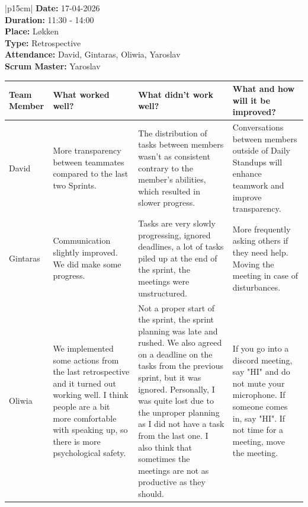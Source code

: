 \begin{table}[H]
    \centering
    \begin{tabular}{|p{15cm}|}   
        \hline
        \textbf{Date:}  17-04-2026 \\
        \textbf{Duration:} 11:30 - 14:00 \\
        \textbf{Place:}  Løkken \\
        \textbf{Type:} Retrospective \\
        \textbf{Attendance:} David, Gintaras, Oliwia, Yaroslav \\
        \textbf{Scrum Master:} Yaroslav 
        \begin{table}[H]
            \begin{tabular}{|p{1.75cm}|p{4cm}|p{4cm}|p{4cm}|}
                \hline
                \cellcolor[HTML]{BFBFBF}  \textbf{Team Member} & \cellcolor[HTML]{BFBFBF} \textbf{What worked well?} & \cellcolor[HTML]{BFBFBF}  \textbf{What didn’t work well?} & \cellcolor[HTML]{BFBFBF}  \textbf{What and how will it be improved?}\\
                \hline
                \cellcolor[HTML]{d4d4d4} David & More transparency between teammates compared to the last two Sprints. & The distribution of tasks between members wasn't as consistent contrary to the member's abilities, which resulted in slower progress.  & Conversations between members outside of Daily Standups will enhance teamwork and improve transparency.  \\
                \hline
                \cellcolor[HTML]{d4d4d4} Gintaras & Communication slightly improved. We did make some progress. & Tasks are very slowly progressing, ignored deadlines, a lot of tasks piled up at the end of the sprint, the meetings were unstructured. & More frequently asking others if they need help. Moving the meeting in case of disturbances. \\
                \hline
                \cellcolor[HTML]{d4d4d4} Oliwia & We implemented some actions from the last retrospective and it turned out working well. I think people are a bit more comfortable with speaking up, so there is more psychological safety. & Not a proper start of the sprint, the sprint planning was late and rushed. We also agreed on a deadline on the tasks from the previous sprint, but it was ignored. Personally, I was quite lost due to the unproper planning as I did not have a task from the last one. I also think that sometimes the meetings are not as productive as they should. & If you go into a discord meeting, say "HI" and do not mute your microphone.  If someone comes in, say "HI". If not time for a meeting, move the meeting. \\
                \hline
            \end{tabular}
        \end{table}
         \\
        \hline
    \end{tabular}
\end{table}

